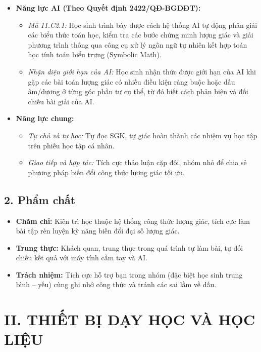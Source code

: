 \documentclass[12pt, a4paper]{article}
\begin{document}
\begin{itemize}[leftmargin=1.2cm]
    \item \textbf{Năng lực AI (Theo Quyết định 2422/QĐ-BGDĐT):}
    \begin{itemize}[leftmargin=0.6cm]
        \item \textit{Mã 11.C2.1:} Học sinh trình bày được cách hệ thống AI tự động phân giải các biểu thức toán học, kiểm tra các bước chứng minh lượng giác và giải phương trình thông qua công cụ xử lý ngôn ngữ tự nhiên kết hợp toán học tính toán biểu trưng (Symbolic Math).
        \item \textit{Nhận diện giới hạn của AI:} Học sinh nhận thức được giới hạn của AI khi gặp các bài toán lượng giác có nhiều điều kiện ràng buộc hoặc dấu âm/dương ở từng góc phần tư cụ thể, từ đó biết cách phản biện và đối chiếu bài giải của AI.
    \end{itemize}

    \item \textbf{Năng lực chung:}
    \begin{itemize}[leftmargin=0.6cm]
        \item \textit{Tự chủ và tự học:} Tự đọc SGK, tự giác hoàn thành các nhiệm vụ học tập trên phiếu học tập cá nhân.
        \item \textit{Giao tiếp và hợp tác:} Tích cực thảo luận cặp đôi, nhóm nhỏ để chia sẻ phương pháp biến đổi công thức lượng giác tối ưu.
    \end{itemize}
\end{itemize}

\subsection*{2. Phẩm chất}

\begin{itemize}[leftmargin=1.2cm]
    \item \textbf{Chăm chỉ:} Kiên trì học thuộc hệ thống công thức lượng giác, tích cực làm bài tập rèn luyện kỹ năng biến đổi đại số lượng giác.
    \item \textbf{Trung thực:} Khách quan, trung thực trong quá trình tự làm bài, tự đối chiếu kết quả với máy tính cầm tay và AI.
    \item \textbf{Trách nhiệm:} Tích cực hỗ trợ bạn trong nhóm (đặc biệt học sinh trung bình -- yếu) cùng ghi nhớ công thức và tránh các sai lầm về dấu.
\end{itemize}

\section*{II. THIẾT BỊ DẠY HỌC VÀ HỌC LIỆU}
\end{document}
